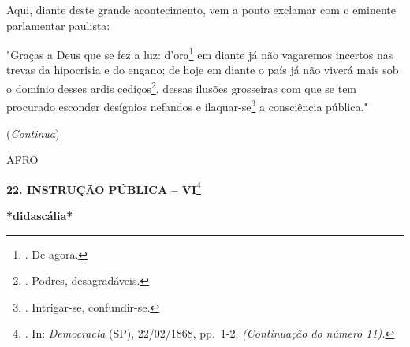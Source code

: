 Aqui, diante deste grande acontecimento, vem a ponto exclamar com o
eminente parlamentar paulista:

"Graças a Deus que se fez a luz: d'ora\footnote{. De agora.} em diante
já não vagaremos incertos nas trevas da hipocrisia e do engano; de hoje
em diante o país já não viverá mais sob o domínio desses ardis
cediços\footnote{. Podres, desagradáveis.}, dessas ilusões grosseiras
com que se tem procurado esconder desígnios nefandos e
ilaquar-se\footnote{. Intrigar-se, confundir-se.} a consciência
pública."

(\emph{Continua})

AFRO

\textbf{22. INSTRUÇÃO PÚBLICA -- VI}\footnote{. In: \emph{Democracia}
  (SP), 22/02/1868, pp.~1-2. \emph{(Continuação do número 11).}}

\textbf{*didascália*}

